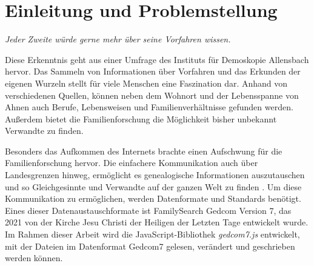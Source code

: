 \chapter{Einleitung und Problemstellung}
\label{chap: Einleitung und Problemstellung}
\begin{center}
	\textit{Jeder Zweite würde gerne mehr über seine Vorfahren wissen.} \cite{DemoskopieAllensbach2007}
\end{center}
Diese Erkenntnis geht aus einer Umfrage des Instituts für Demoskopie Allensbach hervor. Das Sammeln von Informationen über Vorfahren und das Erkunden der eigenen Wurzeln stellt für viele Menschen eine Faszination dar. Anhand von verschiedenen Quellen, können neben dem Wohnort und der Lebensspanne von Ahnen auch Berufe, Lebensweisen und Familienverhältnisse gefunden werden. Außerdem bietet die Familienforschung die Möglichkeit bisher unbekannt Verwandte zu finden. \cite{Malteser}

Besonders das Aufkommen des Internets brachte einen Aufschwung für die Familienforschung hervor. Die einfachere Kommunikation auch über Landesgrenzen hinweg, ermöglicht es genealogische Informationen auszutauschen und so Gleichgesinnte und Verwandte auf der ganzen Welt zu finden \cite{AhnenforschungDE}. Um diese Kommunikation zu ermöglichen, werden Datenformate und Standards benötigt. Eines dieser Datenaustauschformate ist  FamilySearch Gedcom Version 7, das 2021 von der Kirche Jesu Christi der Heiligen der Letzten Tage entwickelt wurde. Im Rahmen dieser Arbeit wird die JavaScript-Bibliothek \textit{gedcom7.js} entwickelt, mit der Dateien im Datenformat Gedcom7 gelesen, verändert und geschrieben werden können. 

